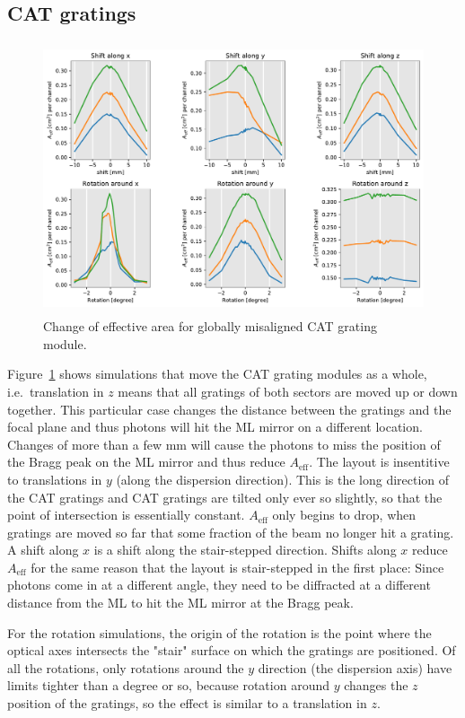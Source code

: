 \documentclass[]{spie}  %
\begin{document}
\subsection{CAT gratings}
\begin{figure} [ht]
  \begin{center}
    \includegraphics[height=8cm]{CAT_global.pdf}
  \end{center}
  \caption
      { \label{fig:CAT_global}Change of effective area for globally misaligned CAT grating module. 
}
\end{figure}
Figure~\ref{fig:CAT_global} shows simulations that move the CAT
grating modules as a whole, i.e.\ translation in $z$ means that all
gratings of both sectors are moved up or down together. This
particular case changes the distance between the gratings and the
focal plane and thus photons will hit the ML mirror on a different
location. Changes of more than a few mm will cause the photons to miss
the position of the Bragg peak on the ML mirror and thus reduce
$A_{\mathrm{eff}}$. The layout is insentitive to translations in $y$
(along the dispersion direction). This is the long direction of the
CAT gratings and CAT gratings are tilted only ever so slightly, so
that the point of intersection is essentially
constant. $A_{\mathrm{eff}}$ only begins to drop, when gratings are
moved so far that some fraction of the beam no longer hit a grating. A
shift along $x$ is a shift along the stair-stepped direction. Shifts
along $x$ reduce $A_{\mathrm{eff}}$ for the same reason that the
layout is stair-stepped in the first place: Since photons come in at a
different angle, they need to be diffracted at a different distance
from the ML to hit the ML mirror at the Bragg peak.

For the rotation simulations, the origin of the rotation is the point
where the optical axes intersects the "stair" surface on which the
gratings are positioned. Of all the rotations, only rotations around
the $y$ direction (the dispersion axis) have limits tighter than a
degree or so, because rotation around $y$ changes the $z$ position of
the gratings, so the effect is similar to a translation in $z$.
\end{document}

